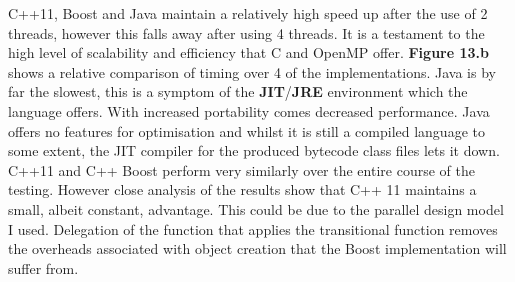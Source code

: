 \documentclass[11pt]{article} %
\begin{document}
C++11, Boost and Java maintain a relatively high speed up after the use of 2 threads, however this falls away after using 4 threads. It is a testament to the high level of scalability and efficiency that C and OpenMP offer. {\bf Figure 13.b} shows a relative comparison of timing over 4 of the implementations. Java is by far the slowest, this is a symptom of the {\bf JIT}/{\bf JRE} environment which the language offers. With increased portability comes decreased performance. Java offers no features for optimisation and whilst it is still a compiled language to some extent, the JIT compiler for the produced bytecode class files lets it down. C++11 and C++ Boost perform very similarly over the entire course of the testing. However close analysis of the results show that C++ 11 maintains a small, albeit constant, advantage. This could be due to the parallel design model I used. Delegation of the function that applies the transitional function removes the overheads associated with object creation that the Boost implementation will suffer from. 
\end{document}
